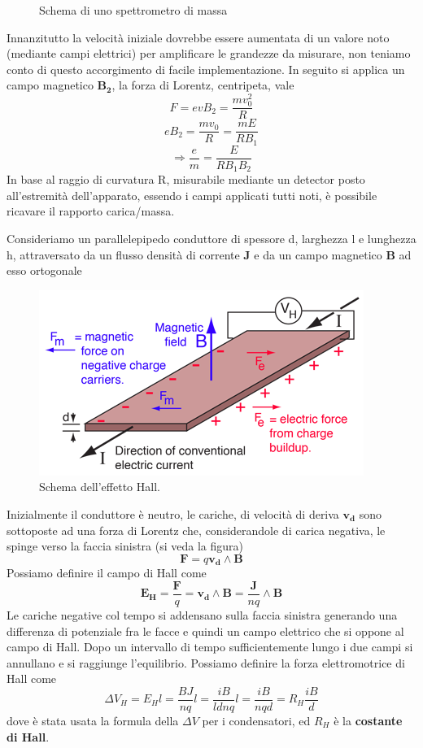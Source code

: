 \documentclass[
10pt, %
a4paper, %
oneside, %
headinclude,footinclude, %
BCOR5mm, %
]{scrartcl}
\begin{document}
\begin{applicazione}
\begin{figure}[h!]
	\caption{Schema di uno spettrometro di massa}
	\label{fig:spettrometro}
\end{figure}
\FloatBarrier
Innanzitutto la velocità iniziale dovrebbe essere aumentata di un valore noto (mediante campi elettrici) per amplificare le grandezze da misurare, non teniamo conto di questo accorgimento di facile implementazione. In seguito si applica un campo magnetico $\mathbf{B_2}$, la forza di Lorentz, centripeta, vale
\[F = evB_2= \frac{mv_0^2}{R}\]
\[eB_2 = \frac{mv_0}{R}= \frac{mE}{RB_1} \]
\[\Rightarrow \frac{e}{m}= \frac{E}{RB_1B_2}\]
In base al raggio di curvatura R, misurabile mediante un detector posto all'estremità dell'apparato, essendo i campi applicati tutti noti, è possibile ricavare il rapporto carica/massa.
\end{applicazione}
\begin{applicazione}
	Consideriamo un parallelepipedo conduttore di spessore d, larghezza l e lunghezza h, attraversato da un flusso densità di corrente $\mathbf{J}$ e da un campo magnetico \(\mathbf{B}\) ad esso ortogonale
\begin{figure}[h!]
	\centering
	\includegraphics[width=0.6\linewidth]{../images/hall_effect}
	\caption{Schema dell'effetto Hall.}
	\label{fig:halleffect}
\end{figure}
\FloatBarrier
Inizialmente il conduttore è neutro, le cariche, di velocità di deriva $\mathbf{v_d}$ sono sottoposte ad una forza di Lorentz che, considerandole di carica negativa, le spinge verso la faccia sinistra (si veda la figura)
\[\mathbf{F}= q\mathbf{v_d}\wedge\mathbf{B}\] 
Possiamo definire il campo di Hall come
\[\mathbf{E_H}=\frac{\mathbf{F}}{q}=\mathbf{v_d}\wedge\mathbf{B}=\frac{\mathbf{J}}{nq}\wedge\mathbf{B}\]
Le cariche negative col tempo si addensano sulla faccia sinistra generando una differenza di potenziale fra le facce e quindi un campo elettrico che si oppone al campo di Hall. Dopo un intervallo di tempo sufficientemente lungo i due campi si annullano e si raggiunge l'equilibrio. Possiamo definire la forza elettromotrice di Hall come
\[\Delta V_H = E_H l =\frac{BJ}{nq}l =\frac{iB}{ldnq}l=\frac{i B}{nqd} = R_H \frac{iB}{d}\] 
dove è stata usata la formula della \(\Delta V\) per i condensatori, ed \(R_H\) è la \textbf{costante di Hall}.
\end{applicazione}
\end{document}
